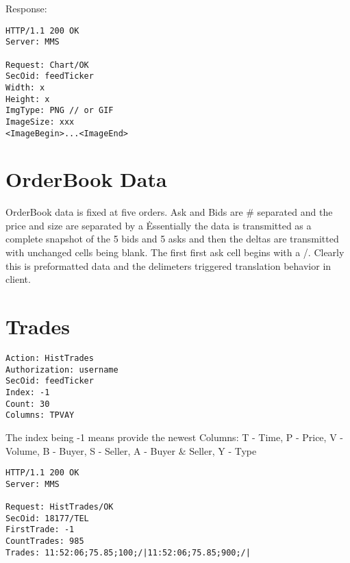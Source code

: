 \documentclass[12pt,twoside,letterpaper]{report}
\begin{document}
Response:
\begin{verbatim}
HTTP/1.1 200 OK
Server: MMS

Request: Chart/OK
SecOid: feedTicker
Width: x
Height: x
ImgType: PNG // or GIF
ImageSize: xxx
<ImageBegin>...<ImageEnd>
\end{verbatim}


\section*{OrderBook Data}
OrderBook data is fixed at five orders. Ask and Bids are # separated and the price and size are separated by a \. Essentially the data is transmitted as a complete
snapshot of the 5 bids and 5 asks and then the deltas are transmitted with unchanged cells being blank. The first first ask cell begins with a /. Clearly this is
preformatted data and the delimeters triggered translation behavior in client.

\section*{Trades}
\begin{verbatim}
Action: HistTrades
Authorization: username
SecOid: feedTicker
Index: -1
Count: 30
Columns: TPVAY
\end{verbatim}

The index being -1 means provide the newest
Columns: T - Time, P - Price, V - Volume, B - Buyer, S - Seller, A - Buyer & Seller, Y - Type 

\begin{verbatim}
HTTP/1.1 200 OK
Server: MMS

Request: HistTrades/OK
SecOid: 18177/TEL
FirstTrade: -1
CountTrades: 985
Trades: 11:52:06;75.85;100;/|11:52:06;75.85;900;/|
\end{verbatim}
\end{document}
